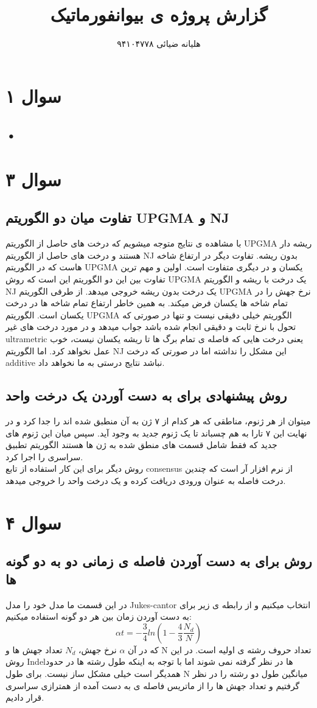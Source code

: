 \documentclass[11pt, oneside]{article}
\title{گزارش پروژه ی بیوانفورماتیک}
\author{هلیانه ضیائی	۹۴۱۰۴۷۷۸}
\begin{document}
\maketitle
\section*{سوال ۱}
\subsection*{•}
\section*{سوال ۳}
\subsection*{تفاوت میان دو الگوریتم UPGMA و NJ}
با مشاهده ی نتایج متوجه میشویم که درخت های حاصل از الگوریتم UPGMA ریشه دار هستند و درخت های حاصل از الگوریتم NJ بدون ریشه. تفاوت دیگر در ارتفاع شاخه هاست که در الگوریتم UPGMA یکسان و در دیگری متفاوت است.
اولین و مهم ترین تفاوت بین این دو الگوریتم این است که روش UPGMA یک درخت با ریشه و الگوریتم NJ یک درخت بدون ریشه خروجی میدهد. از طرفی الگوریتم UPGMA نرخ جهش را در تمام شاخه ها یکسان فرض میکند. به همین خاطر ارتفاع تمام شاخه ها در درخت یکسان است.
الگوریتم UPGMA الگوریتم خیلی دقیقی نیست و تنها در صورتی که تحول با نرخ ثابت و دقیقی انجام شده باشد جواب میدهد و در مورد درخت های غیر ultrametric یعنی درخت هایی که فاصله ی تمام برگ ها تا ریشه یکسان نیست، خوب عمل نخواهد کرد. اما الگوریتم NJ این مشکل را نداشته اما در صورتی که درخت additive نباشد نتایج درستی به ما نخواهد داد.
\hyperlink{}{\cite{a1,a2}}
\subsection*{روش پیشنهادی برای به دست آوردن یک درخت واحد}
میتوان از هر ژنوم، مناطقی که هر کدام از ۷ ژن به آن منطبق شده اند را جدا کرد و در نهایت این ۷ تارا به هم چسباند تا یک ژنوم جدید به وجود آید. سپس میان این ژنوم های جدید که فقط شامل قسمت های منطق شده به ژن ها هستند الگوریتم تطبیق سراسری را اجرا کرد.
\cite{a3}\\
روش دیگر برای این کار استفاده از تابع consensus از نرم افزار آر است که چندین درخت فاصله به عنوان ورودی دریافت کرده و یک درخت واحد را خروجی میدهد.
\section*{سوال ۴}
\subsection*{روش برای به دست آوردن فاصله ی زمانی دو به دو گونه ها}
در این قسمت ما مدل خود را مدل Jukes-cantor انتخاب میکنیم و از رابطه ی زیر برای به دست آوردن زمان بین هر دو گونه استفاده میکنیم:
$$\alpha t = -\frac{3}{4}ln(1- \frac{4}{3}\frac{N_d}{N})$$
که در آن $\alpha$ نرخ جهش، $N_d$ تعداد جهش ها و N تعداد حروف رشته ی اولیه است. در این روش Indelها در نظر گرفته نمی شوند اما با توجه به اینکه طول رشته ها در حدود همدیگر است خیلی مشکل ساز نیست. برای طول N میانگین طول دو رشته را در نظر گرفتیم و تعداد جهش ها را از ماتریس فاصله ی به دست آمده از همترازی سراسری قرار دادیم.
\hyperlink{}{\cite{a4, a5}}
\end{document}
